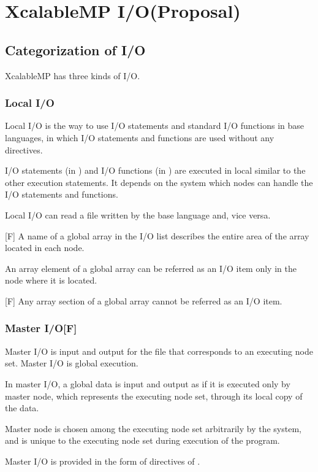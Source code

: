 
 \chapter{XcalableMP I/O(Proposal)}

 \section{Categorization of I/O}
 XcalableMP has three kinds of I/O.

  \subsection{Local I/O}

  Local I/O is the way to use I/O statements and standard I/O functions in
  base languages, in which I/O statements and functions are used without
  any directives.

  I/O statements (in {\XMP} {\Fort}) and I/O functions (in {\XMP} {\C})
  are executed in local similar to the other execution statements.
  It depends on the system which nodes can handle the I/O statements and
  functions.

  Local I/O can read a file written by the base language and, vice
  versa.

  [F] A name of a global array in the I/O list describes the
  entire area of the array located in each node.

  An array element of a global array can be referred as an I/O item only
  in the node where it is located.

  [F] Any array section of a global array cannot be referred as an
  I/O item.

  \subsection{Master I/O[F]}

  Master I/O is input and output for the file that corresponds to an
  executing node set.
  Master I/O is global execution.

  In master I/O, a global data is input and output as if it is executed
  only by master node, which represents the executing node set, through
  its local copy of the data.

  Master node is chosen among the executing node set arbitrarily by the
  system, and is unique to the executing node set during execution of
  the program.

  Master I/O is provided in the form of directives of {\XMP} {\Fort}.

